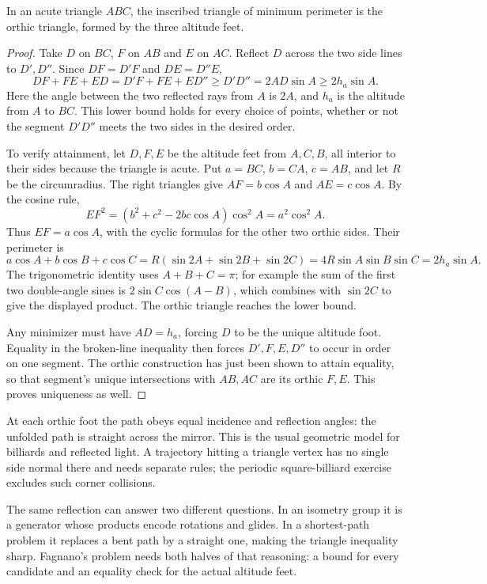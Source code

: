 \begin{theorem}[Fagnano]\label{geometry:thm:fagnano}
In an acute triangle $ABC$, the inscribed triangle of minimum perimeter is the orthic triangle, formed by the three altitude feet.
\end{theorem}
\begin{proof}
Take $D$ on $BC$, $F$ on $AB$ and $E$ on $AC$. Reflect $D$ across the two side lines to $D',D''$. Since $DF=D'F$ and $DE=D''E$,
\[
DF+FE+ED=D'F+FE+ED''\ge D'D''=2AD\sin A\ge2h_a\sin A.
\]
Here the angle between the two reflected rays from $A$ is $2A$, and $h_a$ is the altitude from $A$ to $BC$. This lower bound holds for every choice of points, whether or not the segment $D'D''$ meets the two sides in the desired order.

To verify attainment, let $D,F,E$ be the altitude feet from $A,C,B$, all interior to their sides because the triangle is acute. Put $a=BC$, $b=CA$, $c=AB$, and let $R$ be the circumradius. The right triangles give $AF=b\cos A$ and $AE=c\cos A$. By the cosine rule,
\[
EF^2=(b^2+c^2-2bc\cos A)\cos^2 A=a^2\cos^2 A.
\]
Thus $EF=a\cos A$, with the cyclic formulas for the other two orthic sides. Their perimeter is
\[
a\cos A+b\cos B+c\cos C
=R(\sin2A+\sin2B+\sin2C)
=4R\sin A\sin B\sin C=2h_a\sin A.
\]
The trigonometric identity uses $A+B+C=\pi$; for example the sum of the first two double-angle sines is $2\sin C\cos(A-B)$, which combines with $\sin2C$ to give the displayed product. The orthic triangle reaches the lower bound.

Any minimizer must have $AD=h_a$, forcing $D$ to be the unique altitude foot. Equality in the broken-line inequality then forces $D',F,E,D''$ to occur in order on one segment. The orthic construction has just been shown to attain equality, so that segment's unique intersections with $AB,AC$ are its orthic $F,E$. This proves uniqueness as well.
\end{proof}

At each orthic foot the path obeys equal incidence and reflection angles: the unfolded path is straight across the mirror. This is the usual geometric model for billiards and reflected light. A trajectory hitting a triangle vertex has no single side normal there and needs separate rules; the periodic square-billiard exercise excludes such corner collisions.

\begin{beauty}
The same reflection can answer two different questions. In an isometry group it is a generator whose products encode rotations and glides. In a shortest-path problem it replaces a bent path by a straight one, making the triangle inequality sharp. Fagnano's problem needs both halves of that reasoning: a bound for every candidate and an equality check for the actual altitude feet.
\end{beauty}

